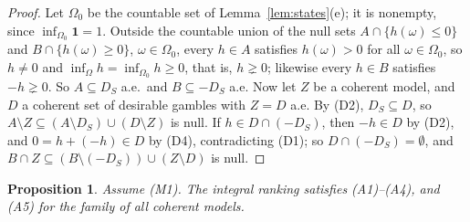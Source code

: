 \documentclass[11pt]{article}
\newcommand{\one}{\mathbf{1}}
\theoremstyle{plain}
\newtheorem{proposition}[theorem]{Proposition}
\theoremstyle{definition}
\begin{document}
\begin{proof}
Let $\Omega_0$ be the countable set of Lemma~\ref{lem:states}(e); it is nonempty, since
$\inf_{\Omega_0}\one=1$. Outside the countable union of the null sets $A\cap\{h(\omega)\le0\}$
and $B\cap\{h(\omega)\ge0\}$, $\omega\in\Omega_0$, every $h\in A$ satisfies $h(\omega)>0$ for
all $\omega\in\Omega_0$, so $h\ne0$ and $\inf_\Omega h=\inf_{\Omega_0}h\ge0$, that is,
$h\gneq0$; likewise every $h\in B$ satisfies $-h\gneq0$. So $A\subseteq D_S$ a.e.\ and
$B\subseteq-D_S$ a.e. Now let $Z$ be a coherent model, and $D$ a coherent set of desirable
gambles with $Z=D$ a.e. By (D2), $D_S\subseteq D$, so $A\setminus Z\subseteq(A\setminus D_S)\cup
(D\setminus Z)$ is null. If $h\in D\cap(-D_S)$, then $-h\in D$ by (D2), and $0=h+(-h)\in D$ by
(D4), contradicting (D1); so $D\cap(-D_S)=\emptyset$, and $B\cap Z\subseteq(B\setminus(-D_S))
\cup(Z\setminus D)$ is null.
\end{proof}

\begin{proposition}\label{prop:axioms}
Assume (M1). The integral ranking satisfies (A1)--(A4), and (A5) for the family of all coherent
models.
\end{proposition}
\end{document}
